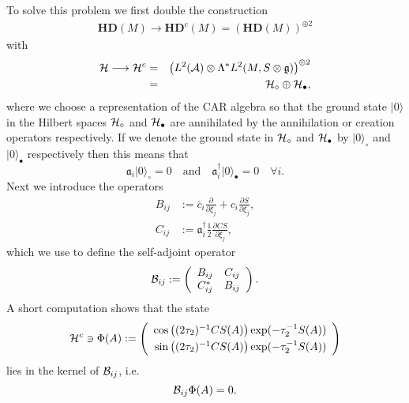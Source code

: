 \documentclass[12pt]{article}
\newcommand{\nn}{\nonumber}
\def\ca{{\cal A}}
\def\cb{{\cal B}}
\def\ch{{\cal H}}
\newcommand{\pa}{\partial}
\begin{document}
To solve this problem we first double the construction 
\begin{eqnarray}
\mathbf{HD}(M) \longrightarrow \mathbf{HD}^c(M) =  \left(\mathbf{HD}(M)\right)^{ \oplus 2}
\label{HDC}
\end{eqnarray}
with
\begin{eqnarray}
\ch \longrightarrow \ch^c &=& \left( L^2(\ca)   \otimes  \Lambda^* L^2(M,S\otimes\mathfrak{g}) \right)^{\oplus 2}
\nn\\
&=& \ch_\circ \oplus \ch_\bullet,
\label{HC}
\end{eqnarray}
where we choose a representation of the CAR algebra so that 
 the ground state $\vert 0 \rangle$ in the Hilbert spaces $\ch_\circ$ and $\ch_\bullet$ are annihilated by the annihilation or creation operators respectively. If we denote the ground state in $\ch_\circ$ and $\ch_\bullet$ by $\vert 0 \rangle_\circ$ and $\vert 0 \rangle_\bullet$ respectively then this means that
 \begin{equation}
 \mathfrak{a}_i\vert 0 \rangle_\circ=0
 \quad
 \mbox{and} 
 \quad
 \mathfrak{a}_i^\dagger\vert 0 \rangle_\bullet=0\quad \forall i.
 \label{Miami}
 \end{equation}
Next we introduce the operators 
\begin{align}
B_{ij} &:= \bar{c}_i \frac{\pa}{\pa \xi_j}  + c_i  \frac{\pa S }{\pa\xi_{j }},
\nn\\
 C_{ij}  &:=       \mathfrak{a}_i^\dagger  \frac{1}{2}   \frac{\pa CS }{\pa\xi_{j }}  ,
\end{align}
which we use to define the self-adjoint operator
\begin{eqnarray}
\cb_{ij} :=   \left(
\begin{array}{cc}
 B_{ij}  & C_{ij} \\ 
C^*_{ij}    &  B_{ij}
\end{array}
\right).
\label{BDx2}
\end{eqnarray}
A short computation shows that the state 
\begin{equation}
\ch^c \ni \Phi (A) := \left(
\begin{array}{r}
\cos \left(({2\tau_2})^{-1}   CS(A)\right) \exp(-\tau_2^{-1}S(A))  
\vspace{0,1cm}
\\
 \sin\left(({2\tau_2})^{-1}  CS(A)\right)  \exp(-\tau_2^{-1}S(A)) 
\end{array}
\right) 
\label{platter}
\end{equation}
lies in the kernel of $\cb_{ij}$, i.e.
\begin{equation}
\cb_{ij} \Phi(A) = 0.
\label{T1}
\end{equation}
\end{document}

